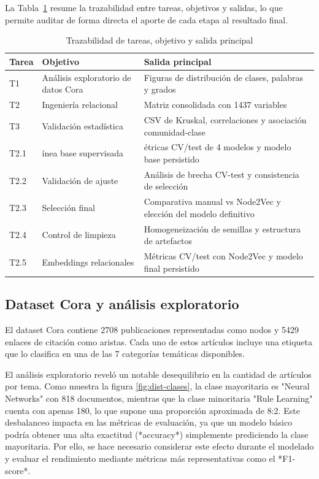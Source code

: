 \documentclass[conference,a4paper]{IEEEtran}
\begin{document}
  La Tabla~\ref{tab:trazabilidad} resume la trazabilidad entre tareas, objetivos y salidas, lo que
  permite auditar de forma directa el aporte de cada etapa al resultado final.

  \begin{table}[htbp]
  \caption{Trazabilidad de tareas, objetivo y salida principal}
  \centering
  \begin{tabular}{p{}p{}p{}}
  \toprule
  Tarea & Objetivo & Salida principal \\
  \midrule
  T1 & Análisis exploratorio de datos Cora & Figuras de distribución de clases, palabras y grados \\
  T2 & Ingeniería relacional & Matriz consolidada con 1437 variables \\
  T3 & Validación estadística & CSV de Kruskal, correlaciones y asociación comunidad-clase \\
  T2.1 & ínea base supervisada & étricas CV/test de 4 modelos y modelo base persistido \\
  T2.2 & Validación de ajuste & Análisis de brecha CV-test y consistencia de selección \\
  T2.3 & Selección final & Comparativa manual vs Node2Vec y elección del modelo definitivo \\
  T2.4 & Control de limpieza & Homogeneización de semillas y estructura de artefactos \\
  T2.5 & Embeddings relacionales & Métricas CV/test con Node2Vec y modelo final persistido \\
  \bottomrule
  \end{tabular}
  \label{tab:trazabilidad}
  \end{table}

\subsection{Dataset Cora y análisis exploratorio}


El dataset Cora contiene 2708 publicaciones representadas como nodos y 5429 enlaces de citación como aristas. Cada uno de estos artículos incluye una etiqueta que lo clasifica en una de las 7 categorías temáticas disponibles.

El análisis exploratorio reveló un notable desequilibrio en la cantidad de artículos por tema. Como muestra la figura \ref{fig:dist-clases}, la clase mayoritaria es "Neural Networks" con 818 documentos, mientras que la clase minoritaria "Rule Learning" cuenta con apenas 
180, lo que supone una proporción aproximada de 8:2. Este desbalanceo impacta en las métricas de evaluación, ya que un modelo básico podría obtener una alta exactitud (*accuracy*) simplemente prediciendo la clase mayoritaria.
Por ello, se hace necesario considerar este efecto durante el modelado y evaluar el rendimiento mediante métricas más representativas como el *F1-score*. 
\end{document}
